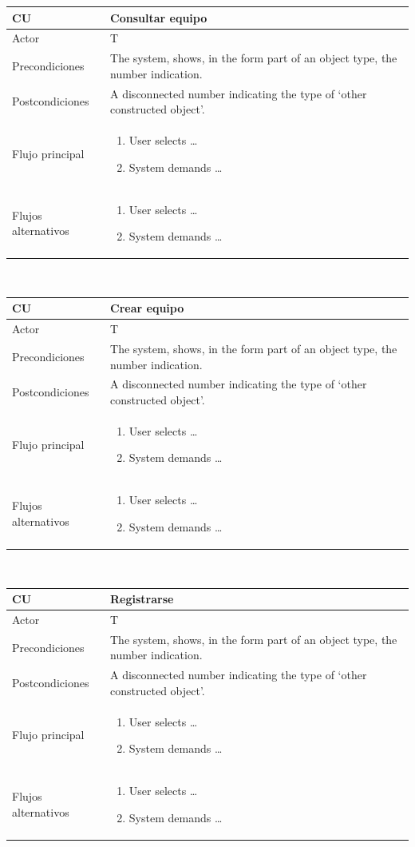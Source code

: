 \documentclass[twoside]{report}
\newcommand\addrow[2]{#1 &#2\\ }
\newcommand\addheading[2]{#1 &#2\\ \hline}
\newcommand\tabularhead{\begin{tabular}{lp{0.7\textwidth}}
\hline
}
\newcommand\addmulrow[2]{ \begin{minipage}[t][][t]{2.5cm}#1\end{minipage}%
   &\begin{minipage}[t][][t]{8cm}
    \begin{enumerate} #2   \end{enumerate}
    \end{minipage}\\ }
\newenvironment{usecase}{\tabularhead}
{\hline\end{tabular}}
\begin{document}
\begin{usecase}
  \addheading{\textbf{CU\arabic{usecase}}}{Consultar equipo} 
  \addrow{Actor}{T}
  \addrow{Precondiciones}{The system, shows, in the form part of an object type, the number indication.}
  \addrow{Postcondiciones}{A disconnected number indicating the type of `other constructed object'.}
  \addmulrow{Flujo principal}{
  		\item User selects \ldots
        \item System demands \ldots
  }
  \addmulrow{Flujos alternativos}{
  		\item User selects \ldots
        \item System demands \ldots
  }
\end{usecase}\\

\begin{usecase}
  \addheading{\textbf{CU\arabic{usecase}}}{Crear equipo} 
  \addrow{Actor}{T}
  \addrow{Precondiciones}{The system, shows, in the form part of an object type, the number indication.}
  \addrow{Postcondiciones}{A disconnected number indicating the type of `other constructed object'.}
  \addmulrow{Flujo principal}{
  		\item User selects \ldots
        \item System demands \ldots
  }
  \addmulrow{Flujos alternativos}{
  		\item User selects \ldots
        \item System demands \ldots
  }
\end{usecase}\\

\begin{usecase}
  \addheading{\textbf{CU\arabic{usecase}}}{Registrarse} 
  \addrow{Actor}{T}
  \addrow{Precondiciones}{The system, shows, in the form part of an object type, the number indication.}
  \addrow{Postcondiciones}{A disconnected number indicating the type of `other constructed object'.}
  \addmulrow{Flujo principal}{
  		\item User selects \ldots
        \item System demands \ldots
  }
  \addmulrow{Flujos alternativos}{
  		\item User selects \ldots
        \item System demands \ldots
  }
\end{usecase}\\
\end{document}
